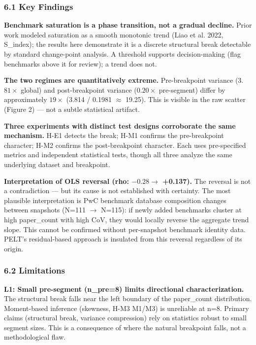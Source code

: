 
\subsubsection{6.1 Key Findings}

\textbf{Benchmark saturation is a phase transition, not a gradual decline.} Prior work modeled saturation as a smooth monotonic trend (Liao et al. 2022, S\_index); the results here demonstrate it is a discrete structural break detectable by standard change-point analysis. A threshold supports decision-making (flag benchmarks above it for review); a trend does not.

\textbf{The two regimes are quantitatively extreme.} Pre-breakpoint variance (3.$81\times$ global) and post-breakpoint variance (0.$20\times$ pre-segment) differ by approximately $19\times$ (3.814 / 0.1981 $\approx$ 19.25). This is visible in the raw scatter (Figure 2) --- not a subtle statistical artifact.

\textbf{Three experiments with distinct test designs corroborate the same mechanism.} H-E1 detects the break; H-M1 confirms the pre-breakpoint character; H-M2 confirms the post-breakpoint character. Each uses pre-specified metrics and independent statistical tests, though all three analyze the same underlying dataset and breakpoint.

\textbf{Interpretation of OLS reversal (rho: $-0.28 \rightarrow$ +0.137).} The reversal is not a contradiction --- but its cause is not established with certainty. The most plausible interpretation is PwC benchmark database composition changes between snapshots (N=111 $\rightarrow$ N=115): if newly added benchmarks cluster at high paper\_count with high CoV, they would locally reverse the aggregate trend slope. This cannot be confirmed without per-snapshot benchmark identity data. PELT's residual-based approach is insulated from this reversal regardless of its origin.

\subsubsection{6.2 Limitations}

\textbf{L1: Small pre-segment (n\_pre=8) limits directional characterization.} The structural break falls near the left boundary of the paper\_count distribution. Moment-based inference (skewness, H-M3 M1/M3) is unreliable at n=8. Primary claims (structural break, variance compression) rely on statistics robust to small segment sizes. This is a consequence of where the natural breakpoint falls, not a methodological flaw.


